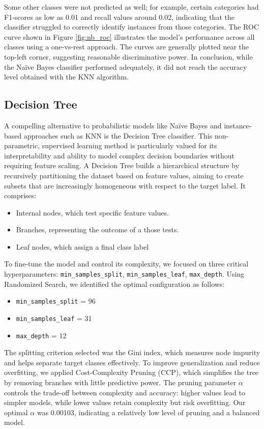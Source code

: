 \documentclass[10pt]{article}
\begin{document}
Some other classes were not predicted as well; for example, certain categories had F1-scores as low as 0.01 and recall values around 0.02, indicating that the classifier struggled to correctly identify instances from those categories. \newline
The ROC curve shown in Figure \ref{fig:nb_roc} illustrates the model's performance across all classes using a one-vs-rest approach. The curves are generally plotted near the top-left corner, suggesting reasonable discriminative power.\newline
In conclusion, while the Naïve Bayes classifier performed adequately, it did not reach the accuracy level obtained with the KNN algorithm.

\subsection{Decision Tree}
A compelling alternative to probabilistic models like Naïve Bayes and instance-based approaches such as KNN is the Decision Tree classifier. This non-parametric, supervised learning method is particularly valued for its interpretability and ability to model complex decision boundaries without requiring feature scaling. \newline
A Decision Tree builds a hierarchical structure by recursively partitioning the dataset based on feature values, aiming to create subsets that are increasingly homogeneous with respect to the target label. It comprises:
\begin{itemize}
	\item Internal nodes, which test specific feature values.
	\item Branches, representing the outcome of a those tests.
	\item Leaf nodes, which assign a final class label 
\end{itemize}
To fine-tune the model and control its complexity, we focused on three critical hyperparameters: \texttt{min\_samples\_split}, \texttt{min\_samples\_leaf}, \texttt{max\_depth}. Using Randomized Search, we identified the optimal configuration as follows:
\begin{itemize}
    \item \texttt{min\_samples\_split} = 96
    \item \texttt{min\_samples\_leaf} = 31
    \item \texttt{max\_depth} = 12
\end{itemize}
The splitting criterion selected was the Gini index, which measures node impurity and helps separate target classes effectively. To improve generalization and reduce overfitting, we applied Cost-Complexity Pruning (CCP), which simplifies the tree by removing branches with little predictive power. The pruning parameter $\alpha$ controls the trade-off between complexity and accuracy: higher values lead to simpler models, while lower values retain complexity but risk overfitting. Our optimal $\alpha$ was 0.00103, indicating a relatively low level of pruning and a balanced model. \newline
\end{document}
